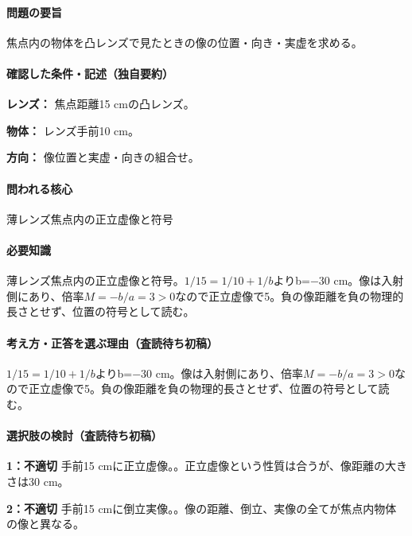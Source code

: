 \paragraph{問題の要旨} 焦点内の物体を凸レンズで見たときの像の位置・向き・実虚を求める。

\paragraph{確認した条件・記述（独自要約）}\mbox{}\par

\noindent\textbf{レンズ：} 焦点距離15 cmの凸レンズ。\par

\noindent\textbf{物体：} レンズ手前10 cm。\par

\noindent\textbf{方向：} 像位置と実虚・向きの組合せ。\par

\paragraph{問われる核心} 薄レンズ焦点内の正立虚像と符号

\paragraph{必要知識} 薄レンズ焦点内の正立虚像と符号。\(1/15=1/10+1/b\)よりb=−30 cm。像は入射側にあり、倍率\(M=-b/a=3>0\)なので正立虚像で5。負の像距離を負の物理的長さとせず、位置の符号として読む。

\paragraph{考え方・正答を選ぶ理由（査読待ち初稿）} \(1/15=1/10+1/b\)よりb=−30 cm。像は入射側にあり、倍率\(M=-b/a=3>0\)なので正立虚像で5。負の像距離を負の物理的長さとせず、位置の符号として読む。

\paragraph{選択肢の検討（査読待ち初稿）}\mbox{}\par

\noindent\textbf{1：不適切} 手前15 cmに正立虚像。。正立虚像という性質は合うが、像距離の大きさは30 cm。\par

\noindent\textbf{2：不適切} 手前15 cmに倒立実像。。像の距離、倒立、実像の全てが焦点内物体の像と異なる。\par

